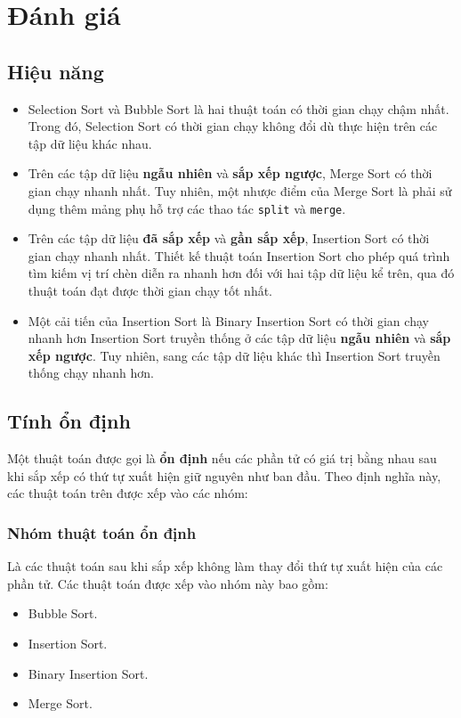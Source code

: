 \documentclass[]{article}
\begin{document}
\section{Đánh giá}
\subsection{Hiệu năng}
\begin{itemize}
\item Selection Sort và Bubble Sort là hai thuật toán có thời gian chạy chậm nhất. Trong đó, Selection Sort có thời gian chạy không đổi dù thực hiện trên các tập dữ liệu khác nhau.
\item Trên các tập dữ liệu \textbf{ngẫu nhiên} và \textbf{sắp xếp ngược}, Merge Sort có thời gian chạy nhanh nhất. Tuy nhiên, một nhược điểm của Merge Sort là phải sử dụng thêm mảng phụ hỗ trợ các thao tác \texttt{split} và \texttt{merge}.
\item Trên các tập dữ liệu \textbf{đã sắp xếp} và \textbf{gần sắp xếp}, Insertion Sort có thời gian chạy nhanh nhất. Thiết kế thuật toán Insertion Sort cho phép quá trình tìm kiếm vị trí chèn diễn ra nhanh hơn đối với hai tập dữ liệu kể trên, qua đó thuật toán đạt được thời gian chạy tốt nhất.
\item Một cải tiến của Insertion Sort là Binary Insertion Sort có thời gian chạy nhanh hơn Insertion Sort truyền thống ở các tập dữ liệu \textbf{ngẫu nhiên} và \textbf{sắp xếp ngược}. Tuy nhiên, sang các tập dữ liệu khác thì Insertion Sort truyền thống chạy nhanh hơn.
\end{itemize}

\subsection{Tính ổn định}
Một thuật toán được gọi là \textbf{ổn định} nếu các phần tử có giá trị bằng nhau sau khi sắp xếp có thứ tự xuất hiện giữ nguyên như ban đầu. Theo định nghĩa này, các thuật toán trên được xếp vào các nhóm:

\subsubsection{Nhóm thuật toán ổn định}
Là các thuật toán sau khi sắp xếp không làm thay đổi thứ tự xuất hiện của các phần tử. Các thuật toán được xếp vào nhóm này bao gồm:
\begin{itemize}
\item Bubble Sort.
\item Insertion Sort.
\item Binary Insertion Sort.
\item Merge Sort.
\end{itemize}
\end{document}
